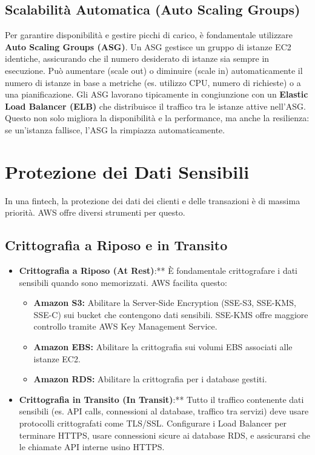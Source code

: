 \subsection{Scalabilità Automatica (Auto Scaling Groups)}
\label{subsec:auto-scaling}
Per garantire disponibilità e gestire picchi di carico, è fondamentale utilizzare \textbf{Auto Scaling Groups (ASG)}. Un ASG gestisce un gruppo di istanze EC2 identiche, assicurando che il numero desiderato di istanze sia sempre in esecuzione. Può aumentare (scale out) o diminuire (scale in) automaticamente il numero di istanze in base a metriche (es. utilizzo CPU, numero di richieste) o a una pianificazione. Gli ASG lavorano tipicamente in congiunzione con un \textbf{Elastic Load Balancer (ELB)} che distribuisce il traffico tra le istanze attive nell'ASG. Questo non solo migliora la disponibilità e la performance, ma anche la resilienza: se un'istanza fallisce, l'ASG la rimpiazza automaticamente.

\section{Protezione dei Dati Sensibili}
\label{sec:data-protection}
In una fintech, la protezione dei dati dei clienti e delle transazioni è di massima priorità. AWS offre diversi strumenti per questo.

\subsection{Crittografia a Riposo e in Transito}
\label{subsec:encryption}
\begin{itemize}
    \item \textbf{Crittografia a Riposo (At Rest)}:** È fondamentale crittografare i dati sensibili quando sono memorizzati. AWS facilita questo:
        \begin{itemize}
            \item \textbf{Amazon S3:} Abilitare la Server-Side Encryption (SSE-S3, SSE-KMS, SSE-C) sui bucket che contengono dati sensibili. SSE-KMS offre maggiore controllo tramite AWS Key Management Service.
            \item \textbf{Amazon EBS:} Abilitare la crittografia sui volumi EBS associati alle istanze EC2.
            \item \textbf{Amazon RDS:} Abilitare la crittografia per i database gestiti.
        \end{itemize}
    \item \textbf{Crittografia in Transito (In Transit)}:** Tutto il traffico contenente dati sensibili (es. API calls, connessioni al database, traffico tra servizi) deve usare protocolli crittografati come TLS/SSL. Configurare i Load Balancer per terminare HTTPS, usare connessioni sicure ai database RDS, e assicurarsi che le chiamate API interne usino HTTPS.
\end{itemize}

